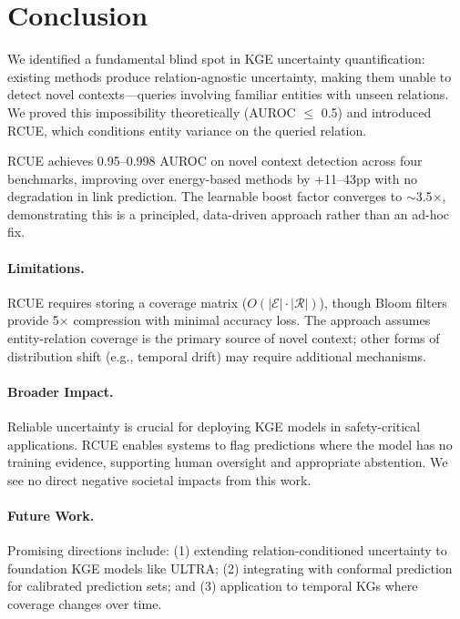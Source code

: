 \section{Conclusion}
\label{sec:conclusion}

We identified a fundamental blind spot in KGE uncertainty quantification: existing methods produce relation-agnostic uncertainty, making them unable to detect novel contexts---queries involving familiar entities with unseen relations. We proved this impossibility theoretically (AUROC $\leq$ 0.5) and introduced RCUE, which conditions entity variance on the queried relation.

RCUE achieves 0.95--0.998 AUROC on novel context detection across four benchmarks, improving over energy-based methods by +11--43pp with no degradation in link prediction. The learnable boost factor converges to $\sim$3.5$\times$, demonstrating this is a principled, data-driven approach rather than an ad-hoc fix.

\paragraph{Limitations.}
RCUE requires storing a coverage matrix ($O(|\mathcal{E}| \cdot |\mathcal{R}|)$), though Bloom filters provide 5$\times$ compression with minimal accuracy loss. The approach assumes entity-relation coverage is the primary source of novel context; other forms of distribution shift (e.g., temporal drift) may require additional mechanisms.

\paragraph{Broader Impact.}
Reliable uncertainty is crucial for deploying KGE models in safety-critical applications. RCUE enables systems to flag predictions where the model has no training evidence, supporting human oversight and appropriate abstention. We see no direct negative societal impacts from this work.

\paragraph{Future Work.}
Promising directions include: (1) extending relation-conditioned uncertainty to foundation KGE models like ULTRA; (2) integrating with conformal prediction for calibrated prediction sets; and (3) application to temporal KGs where coverage changes over time.
